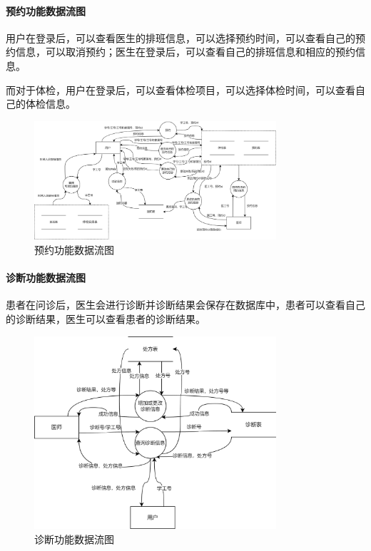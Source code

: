 \documentclass{article}
\begin{document}
\paragraph{预约功能数据流图}

用户在登录后，可以查看医生的排班信息，可以选择预约时间，可以查看自己的预约信息，可以取消预约；医生在登录后，可以查看自己的排班信息和相应的预约信息。

而对于体检，用户在登录后，可以查看体检项目，可以选择体检时间，可以查看自己的体检信息。

\begin{figure}[H]
    \centering
    \includegraphics[width=0.8\textwidth]{images/appointment_dataflow.png}
    \caption{预约功能数据流图}
\end{figure}

\paragraph{诊断功能数据流图}

患者在问诊后，医生会进行诊断并诊断结果会保存在数据库中，患者可以查看自己的诊断结果，医生可以查看患者的诊断结果。

\begin{figure}[H]
    \centering
    \includegraphics[width=0.8\textwidth]{images/diagnosis_dataflow.png}
    \caption{诊断功能数据流图}
\end{figure}
\end{document}
